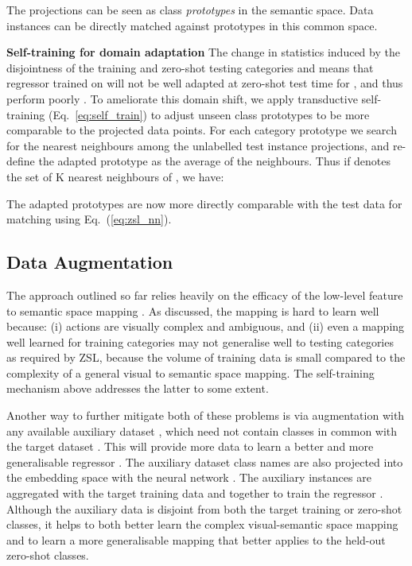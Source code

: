 \documentclass{article}
\begin{document}
The projections  can be seen as class \emph{prototypes} in the semantic space. Data instances  can be directly matched against prototypes in this common space.


\noindent\textbf{Self-training for domain adaptation}\quad
The change in statistics induced by the disjointness of the training and zero-shot testing categories  and  means that regressor  trained on  will not be well adapted at zero-shot test time for , and thus perform poorly \cite{Fu2014a}. To ameliorate this domain shift, we apply transductive self-training (Eq.~\ref{eq:self_train}) to adjust unseen class prototypes to be more comparable to the projected data points. For each category prototype  we search for the  nearest neighbours among the unlabelled test instance projections, and re-define the adapted prototype  as the average of the  neighbours. Thus if  denotes the set of K nearest neighbours of , we have:

The adapted prototypes  are now more directly comparable with the test data for matching using Eq.~(\ref{eq:zsl_nn}).

\subsection{Data Augmentation}\label{sec:augment}
The approach outlined so far relies heavily on the efficacy of the low-level feature to semantic space mapping . As discussed, the mapping is hard to learn well because: (i) actions are visually complex and ambiguous, and (ii) even a mapping well learned for training categories may not generalise well to testing categories as required by ZSL, because the volume of training data is small compared to the complexity of a general visual to semantic space mapping. The self-training mechanism above addresses the latter to some extent.

Another way to further mitigate both of these problems is via augmentation with any available auxiliary dataset , which need not contain classes in common with the target dataset . This will provide more data to learn a better and more generalisable regressor . The auxiliary dataset class names  are also projected into the embedding space with the neural network . The auxiliary instances  are aggregated with the target training data  and together to train the regressor . Although the auxiliary data is disjoint from both the target training or zero-shot classes, it helps to both better learn the complex visual-semantic space mapping and to learn a more generalisable mapping that better applies to  the held-out zero-shot classes.
\end{document}
